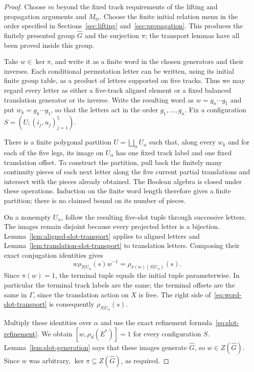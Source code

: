 \begin{proof}
Choose $m$ beyond the fixed track requirements of the lifting and
propagation arguments and $M_{\mathrm{tr}}$.  Choose the
finite initial relation menu in the order specified in
Sections~\ref{sec:lifting} and~\ref{sec:propagation}.  This produces the
finitely presented group $\widehat G$ and the surjection $\pi$; the
transport lemmas have all been proved inside this group.

Take $w\in\ker\pi$, and write it as a finite word in the chosen
generators and their inverses.  Each conditional permutation letter
can be written, using its initial finite group table, as a product of
letters supported on five tracks.  Thus we may regard every letter
as either a five-track aligned element or a fixed balanced translation
generator or its inverse.  Write the resulting word as $w=g_n\cdots g_1$
and put $w_k=g_k\cdots g_1$, so that the letters act in the order
$g_1,\ldots,g_n$.  Fix a configuration
$S=(U;(i_j,u_j)_{j=1}^5)$.

There is a finite polygonal partition $U=\bigsqcup_\alpha U_\alpha$
such that, along every $w_k$ and for each of the five
legs, its image on $U_\alpha$ has one fixed track label and one fixed
translation offset.  To construct the partition, pull back the finitely
many continuity pieces of each next letter along the five current
partial translations and intersect with the pieces already obtained.
The Boolean algebra is closed under these operations.  Induction on
the finite word length therefore gives a finite partition; there is no
claimed bound on its number of pieces.

On a nonempty $U_\alpha$, follow the resulting five-slot tuple through
successive letters.  The images remain disjoint because every projected
letter is a bijection.  Lemma~\ref{lem:aligned-slot-transport} applies
to aligned letters and Lemma~\ref{lem:translation-slot-transport} to
translation letters.  Composing their exact conjugation identities
gives
\begin{equation}
 w\rho_{S|U_\alpha}(s)w^{-1}
   =\rho_{\pi(w)(S|U_\alpha)}(s).
 \label{eq:word-slot-transport}
\end{equation}
Since $\pi(w)=1$, the terminal tuple equals the initial tuple
parameterwise.  In particular the terminal track labels are the same;
the terminal offsets are the same in $\Gamma$, since the translation
action on $X$ is free.  The right side of~\eqref{eq:word-slot-transport}
is consequently $\rho_{S|U_\alpha}(s)$.

Multiply these identities over $\alpha$ and use the exact refinement
formula~\eqref{eq:slot-refinement}.  We obtain
$[w,\rho_S(E^\ast)]=1$ for every configuration $S$.
Lemma~\ref{lem:slot-generation} says that these images generate
$\widehat G$, so $w\in Z(\widehat G)$.  Since $w$ was arbitrary,
$\ker\pi\subseteq Z(\widehat G)$, as required.
\end{proof}
